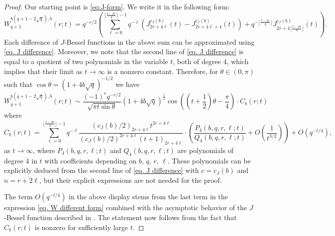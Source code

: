\documentclass[12pt]{amsart}
\numberwithin{equation}{section}
\theoremstyle{boldremark}
\begin{document}
\begin{proof} Our starting point is \eqref{eq:J-form}. We write it in the following form:
\begin{equation}\label{eq. W different form} 
W_{q+1}^{b(q+1-2\sqrt{q}),b}(r;t)=q^{-r/2}\left(\sum_{\ell=0}^{\lfloor\frac{t-2r}{4}\rfloor -1} q^{-\ell}\left(J_{2r+4\ell}^{c_J(b)}(t)-J_{2r+4\ell+4}^{c_J(b)}(t)\right) + q^{-\lfloor\frac{t-2r}{4}\rfloor} J_{2r+4\lfloor\frac{t-2r}{4}\rfloor}^{c_J(b)}(t)\right).
\end{equation}
Each difference of $J$-Bessel functions in the above sum can be approximated using \eqref{eq. J difference}. Moreover, we note that the second line of \eqref{eq. J difference} is equal to a quotient of two polynomials in the variable $t$, both of degree 4, which implies that their limit as $t\to\infty$ is a nonzero constant. Therefore, for $\theta\in(0,\pi)$ such that $\cos\theta=(1+4b\sqrt{q})^{-1/2}$ we have
$$
    W_{q+1}^{b(q+1-2\sqrt{q}),b}(r;t)\sim\frac{(-1)^rq^{-r/2}}{\sqrt{\pi t\sin\theta}}\left( 1+4b\sqrt{q}
\right) ^{\frac{t}{2}}\cos \left( \left( t+\frac{1}{2}\right)
\theta -\frac{\pi}{4} \right)\cdot C_b(r;t)$$
where
$$
C_b(r;t)= \sum_{\ell=0}^{\lfloor\frac{t-2r}{4}\rfloor -1} q^{-\ell}\frac{(c_J(b)/2)_{2r+4\ell}t^{2r+4\ell}}{(c_J(b)/2)^{2r+4\ell}(t+1)_{2r+4\ell}}\cdot \left(\frac{P_4(b,q,r,\ell;t)}{Q_4(b,q,r,\ell;t)}+ O\left(\frac{1}{t^{3/2}}\right)\right) + O(q^{-t/4}),
$$
as $t\to\infty$, where $P_4(b,q,r,\ell;t)$ and $Q_4(b,q,r,\ell;t)$ are polynomials of degree 4 in $t$ with coefficients depending on $b,\,q,\,r,\,\ell$. These polynomials can be explicitly deduced from the second line of \eqref{eq. J difference} with $c=c_J(b)$ and $n=r+2\ell$, but their explicit expressions are not needed for the proof. 

The term $O(q^{-t/4})$ in the above display stems from the last term in the expression \eqref{eq. W different form} combined with the asymptotic behavior of the $J$-Bessel function described in \cite[Theorem 2]{BSS24}. The statement now follows from the fact that $C_b(r;t)$ is nonzero for sufficiently large $t$.
 \end{proof}
\end{document}
